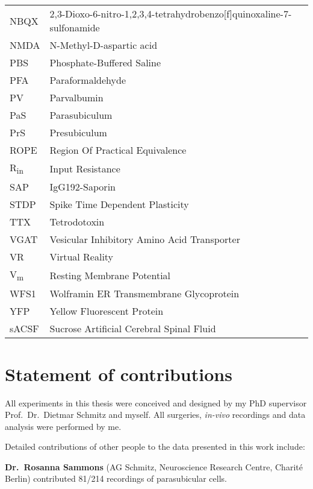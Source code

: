 \documentclass[
  12pt,
  a4paper,
  openany]{book}
\begin{document}
\begin{longtable}[]{@{}ll@{}}
NBQX & 2,3-Dioxo-6-nitro-1,2,3,4-tetrahydrobenzo{[}f{]}quinoxaline-7-sulfonamide \\
NMDA & N-Methyl-D-aspartic acid \\
PBS & Phosphate-Buffered Saline \\
PFA & Paraformaldehyde \\
PV & Parvalbumin \\
PaS & Parasubiculum \\
PrS & Presubiculum \\
ROPE & Region Of Practical Equivalence \\
R\textsubscript{in} & Input Resistance \\
SAP & IgG192-Saporin \\
STDP & Spike Time Dependent Plasticity \\
TTX & Tetrodotoxin \\
VGAT & Vesicular Inhibitory Amino Acid Transporter \\
VR & Virtual Reality \\
V\textsubscript{m} & Resting Membrane Potential \\
WFS1 & Wolframin ER Transmembrane Glycoprotein \\
YFP & Yellow Fluorescent Protein \\
sACSF & Sucrose Artificial Cerebral Spinal Fluid \\
\bottomrule
\end{longtable}

\listoffigures
\pagebreak

\hypertarget{statement-of-contributions}{%
\section*{Statement of contributions}\label{statement-of-contributions}}

All experiments in this thesis were conceived and designed by my PhD supervisor Prof.~Dr.~Dietmar Schmitz and myself. All surgeries, \emph{in-vivo} recordings and data analysis were performed by me.
\vspace{0.5cm}
\hspace{0pt}

\noindent
Detailed contributions of other people to the data presented in this work include:

\vspace{1cm}
\hspace{0pt}

\noindent
\textbf{Dr.~Rosanna Sammons} (AG Schmitz, Neuroscience Research Centre, Charité Berlin) contributed 81/214 recordings of parasubicular cells.
\end{document}
